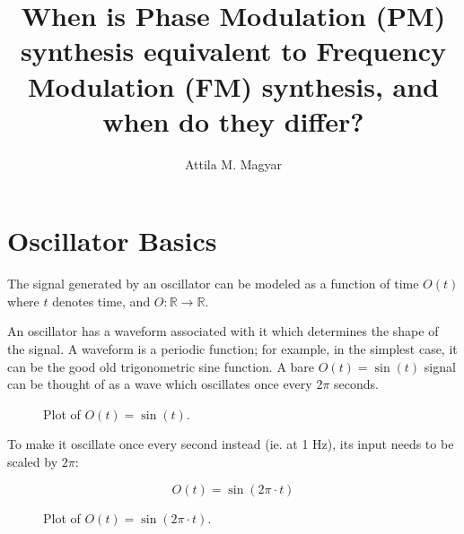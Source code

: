 \documentclass{article}
\title{%
  When is Phase Modulation (PM) synthesis equivalent to
  Frequency Modulation (FM) synthesis,
  and when do they differ?
}
\author{Attila M. Magyar}
\begin{document}
\maketitle
\tableofcontents

\newpage

  \section{Oscillator Basics}

    The signal generated by an oscillator can be modeled as a function of time
    $O(t)$ where $t$ denotes time, and $O \colon \mathbb{R} \to \mathbb{R}$.

    An oscillator has a waveform associated with it which determines the shape
    of the signal. A waveform is a periodic function; for example, in the
    simplest case, it can be the good old trigonometric sine function. A bare
    $O(t) = \sin(t)$ signal can be thought of as a wave which oscillates once
    every $2\pi$ seconds.

    \begin{figure}[!htb]
      \centering
      \caption{%
        Plot of $O(t) = \sin(t)$.
      }
    \end{figure}

    To make it oscillate once every second instead (ie. at 1 Hz), its input
    needs to be scaled by $2\pi$:

    \begin{equation}
      O(t) = \sin(2\pi \cdot t)
    \end{equation}

    \begin{figure}[!htb]
      \centering
      \caption{%
        Plot of $O(t) = \sin(2\pi \cdot t)$.
      }
    \end{figure}
\end{document}
